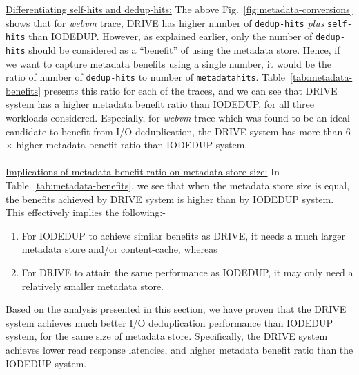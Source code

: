 \underline{Differentiating self-hits and dedup-hits:}
The above Fig.~\ref{fig:metadata-conversions} shows that for \textit{webvm}
trace, DRIVE has higher number of \texttt{dedup-hits} \textit{plus} \texttt{self-hits}
than IODEDUP. However, as explained earlier, only the number of \texttt{dedup-hits}
should be considered as a ``benefit'' of using the metadata store. 
Hence, if we want to capture metadata benefits using a single number, it would be
the ratio of number of \texttt{dedup-hits} to number of \texttt{metadatahits}.
Table~\ref{tab:metadata-benefits} presents this ratio for each of the traces, 
and we can see that DRIVE system has a higher metadata benefit ratio than IODEDUP,
for all three workloads considered.
Especially, for \textit{webvm} trace which was found to be an ideal candidate to
benefit from I/O deduplication, the DRIVE system has more than 6$\times$ higher
metadata benefit ratio than IODEDUP system. 
\\
\\
\underline{Implications of metadata benefit ratio on metadata store size:}
In Table~\ref{tab:metadata-benefits}, we see that when the metadata store
size is equal, the benefits achieved by DRIVE system is higher than by IODEDUP
system. This effectively implies the following:-
\begin{enumerate}
\item For IODEDUP to achieve similar benefits as DRIVE, it needs 
a much larger metadata store and/or content-cache, whereas
\item For DRIVE to attain the same performance as IODEDUP, it may only need
a relatively smaller metadata store.
\end{enumerate}

Based on the analysis presented in this section, we have proven that
the DRIVE system achieves much better I/O deduplication performance
than IODEDUP system, for the same size of metadata store. Specifically,
the DRIVE system achieves lower read response latencies, and higher
metadata benefit ratio than the IODEDUP system.
